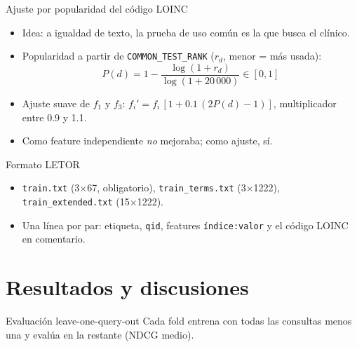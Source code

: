 \documentclass{beamer}
\newcommand{\code}[1]{\texttt{#1}}
\begin{document}
\begin{frame}{Ajuste por popularidad del código LOINC}
    \begin{itemize}
        \item Idea: a igualdad de texto, la prueba de uso común es la que busca el clínico.
        \item Popularidad a partir de \code{COMMON\_TEST\_RANK} ($r_d$, menor = más usada):
        \[ P(d)=1-\frac{\log(1+r_d)}{\log(1+20\,000)} \in [0,1] \]
        \item Ajuste suave de $f_1$ y $f_3$: \quad $f_i' = f_i\,[1+0.1\,(2P(d)-1)]$, \quad multiplicador entre 0.9 y 1.1.
        \item Como feature independiente \emph{no} mejoraba; como ajuste, sí.
    \end{itemize}

\end{frame}

\begin{frame}[fragile]{Formato LETOR}
    \small
    \begin{itemize}
        \item \code{train.txt} (3$\times$67, obligatorio), \code{train\_terms.txt} (3$\times$1222), \code{train\_extended.txt} (15$\times$1222).
        \item Una línea por par: etiqueta, \code{qid}, features \code{índice:valor} y el código LOINC en comentario.
    \end{itemize}
    

\end{frame}


\section{Resultados y discusiones}

\begin{frame}{Evaluación leave-one-query-out}
    \small Cada fold entrena con todas las consultas menos una y evalúa en la restante (NDCG medio).
    \vspace{4pt}

    \centering
    \resizebox{\linewidth}{!}{}

\end{frame}
\end{document}
